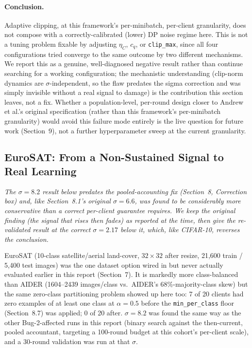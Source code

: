 \documentclass[12pt,a4paper]{article}
\begin{document}
\paragraph{Conclusion.} Adaptive clipping, at this framework's
per-minibatch, per-client granularity, does not compose with a
correctly-calibrated (lower) DP noise regime here. This is not a
tuning problem fixable by adjusting $\eta_C$, $c_q$, or
\texttt{clip\_max}, since all four configurations tried converge to
the same outcome by two different mechanisms. We report this as a
genuine, well-diagnosed negative result rather than continue searching
for a working configuration; the mechanistic understanding (clip-norm
dynamics are $\sigma$-independent, so the flaw predates the sigma
correction and was simply invisible without a real signal to damage)
is the contribution this section leaves, not a fix. Whether a
population-level, per-round design closer to Andrew et al.'s original
specification (rather than this framework's per-minibatch granularity)
would avoid this failure mode entirely is the live question for future
work (Section~9), not a further hyperparameter sweep at the current
granularity.

\subsection{EuroSAT: From a Non-Sustained Signal to Real Learning}
\label{sec:eurosat}

\emph{The $\sigma=8.2$ result below predates the pooled-accounting fix
(Section~8, Correction box) and, like Section~8.1's original $\sigma=6.6$,
was found to be considerably more conservative than a correct per-client
guarantee requires. We keep the original finding (the signal that rises
then fades) as reported at the time, then give the re-validated result at
the correct $\sigma=2.17$ below it, which, like CIFAR-10, reverses the
conclusion.}

EuroSAT (10-class satellite/aerial land-cover, $32\times32$ after resize,
21{,}600 train / 5{,}400 test images) was the one dataset option wired in
but never actually evaluated earlier in this report (Section~7). It is
markedly more class-balanced than AIDER (1604--2439 images/class vs.\
AIDER's 68\%-majority-class skew) but the same zero-class partitioning
problem showed up here too: 7 of 20 clients had zero examples of at least
one class at $\alpha=0.5$ before the \texttt{min\_per\_class} floor
(Section~8.7) was applied; 0 of 20 after. $\sigma=8.2$ was found the same
way as the other Bug-2-affected runs in this report (binary search against
the then-current, pooled accountant, targeting a 100-round budget at this
cohort's per-client scale), and a 30-round validation was run at that
$\sigma$.
\end{document}

